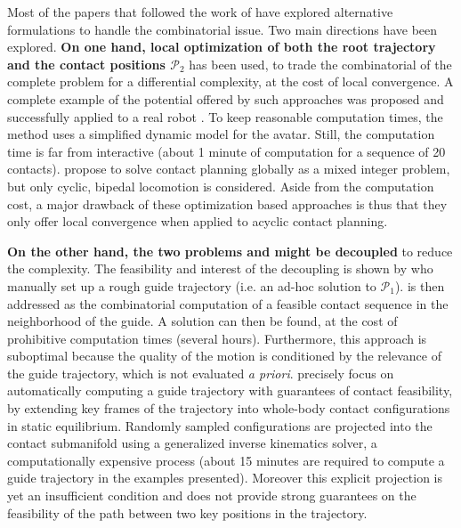 Most of the papers that followed the work of \citeauthor{conf/iser/BretlRLKA04} have explored alternative formulations to handle the combinatorial issue. Two main directions have been explored. \textbf{On one hand, local optimization of both the root trajectory \Pa and the contact positions $\mathcal{P}_2$} has been used, to trade the combinatorial of the complete problem for a differential complexity, at the cost of local convergence. A complete example of the potential offered by such approaches was proposed \citep{Mordatch:2012:DCB:2185520.2185539} and successfully applied to a real robot \citep{mordatch2015}. To keep reasonable computation times, the method uses a simplified dynamic model for the avatar. Still, the computation time is far from interactive  (about 1 minute of computation for a sequence of 20 contacts). \citeauthor{DBLP:conf/humanoids/DeitsT14} propose to solve contact planning globally as a mixed integer problem, but only cyclic, bipedal locomotion is considered. Aside from the computation cost, a major drawback of these optimization based approaches is thus that they only offer local convergence when applied to acyclic contact planning.

\textbf{On the other hand, the two problems \Pa and \Pb might be decoupled} to reduce the complexity. The feasibility and interest of the decoupling is shown by \citeauthor{DBLP:conf/iser/EscandeKMG08} who manually set up a rough guide trajectory (i.e. an ad-hoc solution to $\mathcal{P}_1$). \Pb  is then addressed as the combinatorial computation of a feasible contact sequence in the neighborhood of the guide. A solution can then be found, at the cost of prohibitive computation times (several hours). Furthermore, this approach is suboptimal because the quality of the motion is conditioned by the relevance  of the guide trajectory,  which is not evaluated \textit{a priori}. \citeauthor{Bouyarmane2009} precisely focus on automatically computing a guide trajectory with guarantees of contact feasibility, by extending key frames of the trajectory into whole-body contact configurations in static equilibrium. Randomly sampled configurations are projected into the contact submanifold using a generalized inverse kinematics solver, a computationally expensive process (about 15 minutes are required to compute a guide trajectory in the examples presented). Moreover this explicit projection is yet an insufficient condition and does not provide strong guarantees on the feasibility of the path between two key positions in the trajectory.

